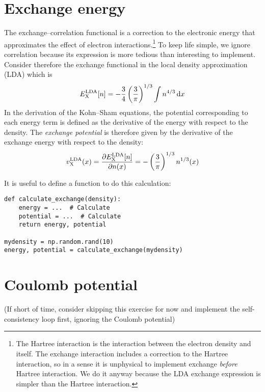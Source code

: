 \documentclass{article}
\begin{document}
\section*{Exchange energy}
The exchange--correlation functional is a correction to the
electronic energy that approximates the effect of electron
interactions.\footnote{The Hartree interaction is the interaction between the electron density and itself.  The exchange interaction
  includes a correction to the Hartree interaction, so in a sense it is unphysical to implement exchange \emph{before} Hartree interaction.
We do it anyway because the LDA exchange expression is simpler than the Hartree interaction.}
To keep life simple, we ignore correlation because its expression
is more tedious than interesting to implement.
Consider therefore the exchange functional in the local density approximation (LDA) which is
\begin{align}
  E_{\mathrm{X}}^{\mathrm{LDA}}[n] = -\frac 34 \left(\frac 3 \pi\right)^{1/3} \int n^{4/3} \,\mathrm d x
\end{align}
In the derivation of the Kohn--Sham equations, the potential
corresponding to each energy term is defined
as the derivative of the energy with respect to the density.
The \emph{exchange potential} is therefore given by the derivative
of the exchange energy with respect to the density:
\begin{align}
  v_{\mathrm{X}}^{\mathrm{LDA}}(x) = \frac{\partial E_{\mathrm{X}}^{\mathrm{LDA}}[n]}{\partial n(x)} = -\left(\frac3 \pi\right)^{1/3}
  n^{1/3}(x)
\end{align}


It is useful to define a function to do this calculation:
\begin{lstlisting}
def calculate_exchange(density):
    energy = ...  # Calculate
    potential = ...  # Calculate
    return energy, potential

mydensity = np.random.rand(10)
energy, potential = calculate_exchange(mydensity)
\end{lstlisting}


\section*{Coulomb potential}
(If short of time, consider skipping this exercise for now and implement the
self-consistency loop first, ignoring the Coulomb potential)
\end{document}
